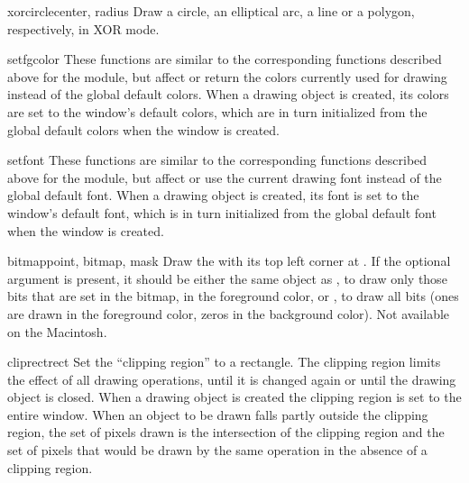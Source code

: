 \begin{methoddesc}[drawing]{xorcircle}{center, radius}
Draw a circle, an elliptical arc, a line or a polygon, respectively,
in XOR mode.
\end{methoddesc}

\begin{methoddesc}[drawing]{setfgcolor}{}
These functions are similar to the corresponding functions described
above for the 
module, but affect or return the colors currently used for drawing
instead of the global default colors.
When a drawing object is created, its colors are set to the window's
default colors, which are in turn initialized from the global default
colors when the window is created.
\end{methoddesc}

\begin{methoddesc}[drawing]{setfont}{}
These functions are similar to the corresponding functions described
above for the 
module, but affect or use the current drawing font instead of
the global default font.
When a drawing object is created, its font is set to the window's
default font, which is in turn initialized from the global default
font when the window is created.
\end{methoddesc}

\begin{methoddesc}[drawing]{bitmap}{point, bitmap, mask}
Draw the  with its top left corner at .
If the optional  argument is present, it should be either
the same object as , to draw only those bits that are set
in the bitmap, in the foreground color, or , to draw all
bits (ones are drawn in the foreground color, zeros in the background
color).
Not available on the Macintosh.
\end{methoddesc}

\begin{methoddesc}[drawing]{cliprect}{rect}
Set the ``clipping region'' to a rectangle.
The clipping region limits the effect of all drawing operations, until
it is changed again or until the drawing object is closed.  When a
drawing object is created the clipping region is set to the entire
window.  When an object to be drawn falls partly outside the clipping
region, the set of pixels drawn is the intersection of the clipping
region and the set of pixels that would be drawn by the same operation
in the absence of a clipping region.
\end{methoddesc}


